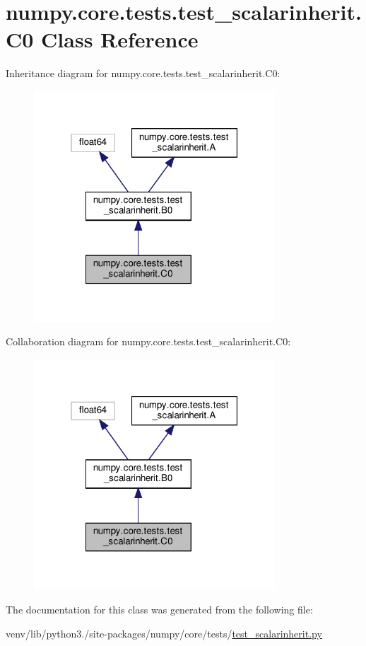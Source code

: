 \hypertarget{classnumpy_1_1core_1_1tests_1_1test__scalarinherit_1_1C0}{}\section{numpy.\+core.\+tests.\+test\+\_\+scalarinherit.\+C0 Class Reference}
\label{classnumpy_1_1core_1_1tests_1_1test__scalarinherit_1_1C0}


Inheritance diagram for numpy.\+core.\+tests.\+test\+\_\+scalarinherit.\+C0\+:
\nopagebreak
\begin{figure}[H]
\begin{center}
\leavevmode
\includegraphics[width=256pt]{classnumpy_1_1core_1_1tests_1_1test__scalarinherit_1_1C0__inherit__graph}
\end{center}
\end{figure}


Collaboration diagram for numpy.\+core.\+tests.\+test\+\_\+scalarinherit.\+C0\+:
\nopagebreak
\begin{figure}[H]
\begin{center}
\leavevmode
\includegraphics[width=256pt]{classnumpy_1_1core_1_1tests_1_1test__scalarinherit_1_1C0__coll__graph}
\end{center}
\end{figure}


The documentation for this class was generated from the following file\+:\begin{DoxyCompactItemize}
\item 
venv/lib/python3./site-\/packages/numpy/core/tests/\hyperlink{test__scalarinherit_8py}{test\+\_\+scalarinherit.\+py}\end{DoxyCompactItemize}
